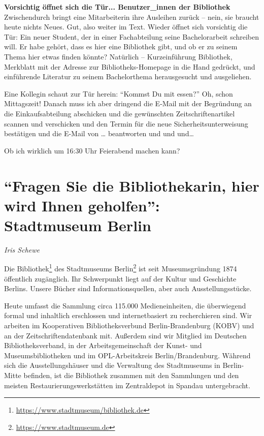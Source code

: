 \documentclass[a4paper,
fontsize=11pt,
oneside,
numbers=noperiodatend,
parskip=half-,
bibliography=totoc,
final
]{scrartcl}
\begin{document}
\textbf{Vorsichtig öffnet sich die Tür... Benutzer\_innen der
Bibliothek} Zwischendurch bringt eine Mitarbeiterin ihre Ausleihen
zurück -- nein, sie braucht heute nichts Neues. Gut, also weiter im
Text. Wieder öffnet sich vorsichtig die Tür: Ein neuer Student, der in
einer Fachabteilung seine Bachelorarbeit schreiben will. Er habe gehört,
dass es hier eine Bibliothek gibt, und ob er zu seinem Thema hier etwas
finden könnte? Natürlich -- Kurzeinführung Bibliothek, Merkblatt mit der
Adresse zur Bibliotheks-Homepage in die Hand gedrückt, und einführende
Literatur zu seinem Bachelorthema herausgesucht und ausgeliehen.

Eine Kollegin schaut zur Tür herein: \enquote{Kommst Du mit essen?} Oh,
schon Mittagszeit! Danach muss ich aber dringend die E-Mail mit der
Begründung an die Einkaufsabteilung abschicken und die gewünschten
Zeitschriftenartikel scannen und verschicken und den Termin für die neue
Sicherheitsunterweisung bestätigen und die E-Mail von \ldots{}
beantworten und und und\ldots{}

Ob ich wirklich um 16:30 Uhr Feierabend machen kann?

\hypertarget{fragen-sie-die-bibliothekarin-hier-wird-ihnen-geholfen-stadtmuseum-berlin}{%
\section{\texorpdfstring{\enquote{Fragen Sie die Bibliothekarin,
hier wird Ihnen geholfen}: Stadtmuseum
Berlin}{``Fragen Sie die Bibliothekarin, hier wird Ihnen geholfen'': Stadtmuseum Berlin}}\label{fragen-sie-die-bibliothekarin-hier-wird-ihnen-geholfen-stadtmuseum-berlin}}

\emph{Iris Schewe}

Die Bibliothek\footnote{\url{https://www.stadtmuseum/bibliothek.de}} des
Stadtmuseums Berlin\footnote{\url{https://www.stadtmuseum.de}} ist seit
Museumsgründung 1874 öffentlich zugänglich. Ihr Schwerpunkt liegt auf
der Kultur und Geschichte Berlins. Unsere Bücher sind
Informationsquellen, aber auch Ausstellungsstücke.

Heute umfasst die Sammlung circa 115.000 Medieneinheiten, die
überwiegend formal und inhaltlich erschlossen und internetbasiert zu
recherchieren sind. Wir arbeiten im Kooperativen Bibliotheksverbund
Berlin-Brandenburg (KOBV) und an der Zeitschriftendatenbank mit.
Außerdem sind wir Mitglied im Deutschen Bibliotheksverband, in der
Arbeitsgemeinschaft der Kunst- und Museumsbibliotheken und im
OPL-Arbeitskreis Berlin/Brandenburg. Während sich die Ausstellungshäuser
und die Verwaltung des Stadtmuseums in Berlin-Mitte befinden, ist die
Bibliothek zusammen mit den Sammlungen und den meisten
Restaurierungswerkstätten im Zentraldepot in Spandau untergebracht.
\end{document}
